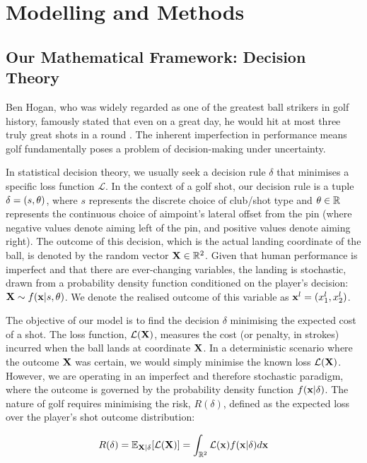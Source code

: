 \documentclass[11pt, letterpaper]{article}
\begin{document}
\section{Modelling and Methods}
\label{sec:Modelling}

\subsection{Our Mathematical Framework: Decision Theory}

Ben Hogan, who was widely regarded as one of the greatest ball strikers in golf history, famously stated that even on a great day, he would hit at most three  truly great shots in a round \parencite{Jenkins_1998}. The inherent imperfection in performance means golf fundamentally poses a problem of decision-making under uncertainty.

In statistical decision theory, we usually seek a decision rule $\delta$ that minimises a specific loss function $\mathcal{L}$. In the context of a golf shot, our decision rule is a tuple $\delta = (s, \theta)$, where $s$ represents the discrete choice of club/shot type and $\theta \in \mathbb{R}$ represents the continuous choice of aimpoint's lateral offset from the pin (where negative values denote aiming left of the pin, and positive values denote aiming right). The outcome of this decision, which is the actual landing coordinate of the ball, is denoted by the random vector $\mathbf{X} \in \mathbb{R}^2$. Given that human performance is imperfect and that there are ever-changing variables, the landing is stochastic, drawn from a probability density function conditioned on the player's decision: $\mathbf{X} \sim f(\mathbf{x} | s, \theta) $. We denote the realised outcome of this variable as $\mathbf{x}^l = (x_1^l,x_2^l)$.

The objective of our model is to find the decision $\delta$ minimising the expected cost of a shot. The loss function, $\mathcal{L}(\mathbf{X})$, measures the cost (or penalty, in strokes) incurred when the ball lands at coordinate $\mathbf{X}$. In a deterministic scenario where the outcome $\mathbf{X}$ was certain, we would simply minimise the known loss $\mathcal{L}(\mathbf{X})$. However, we are operating in an imperfect and therefore stochastic paradigm, where the outcome is governed by the probability density function $f(\mathbf{x} | \delta)$. The nature of golf requires minimising the risk, $R(\delta)$, defined as the expected loss over the player's shot outcome distribution:

$$R(\delta) = \mathbb{E}_{\mathbf{X}|\delta}[\mathcal{L}(\mathbf{X})] = \int_{\mathbb{R}^2}\mathcal{L}(\mathbf{x})f(\mathbf{x} | \delta)d\mathbf{x}$$
\end{document}
